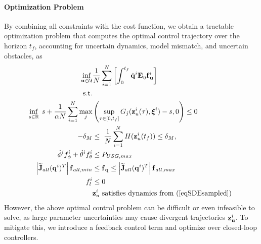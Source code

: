 \documentclass[a4paper,11pt]{article}
\newcommand{\Mat}[1]{\mathbf{\MakeUppercase{#1}}}
\renewcommand{\vec}[1]{\boldsymbol{\mathbf{\MakeLowercase{#1}}}}
\newcommand{\abs}[1]{\left|{#1}\right|}
\begin{document}
\paragraph{Optimization Problem}
By combining all constraints with the cost function, we obtain a tractable optimization problem that computes the optimal control trajectory over the horizon $t_f$, accounting for uncertain dynamics, model mismatch, and uncertain obstacles, as
\begin{subequations}
	\label{eqOCPsaa}
	\begin{align}
	\inf_{\vec{u} \in \mathcal{U}}& \frac 1 N \sum_{i=1}^{N} \left[ \int_0^{t_f} \dot{\vec{q}}^i \Mat{E}_\eta \vec{f}_{\vec{u}}^i \right]
	\\
	\text{s.t.} \notag
	\\
	\inf_{s \in \mathbb{R}} \;  s + \frac{1}{\alpha N} \sum_{i=1}^{N} \max_j &\left( \sup_{\tau \in [0, t_f]} {G}_j({\vec{z}}^i_u(\tau), \vec{\xi}^i) - s, 0 \right) \leq 0 
	\\
	- \delta_M &\leq \; \frac{1}{N} \sum_{i=1}^{N} {H}({\vec{z}}^i_u(t_f)) \leq \delta_M,
	\\
	\dot{\phi}^i f_{\phi}^i + \dot{\theta}^i f_{\theta}^i &\le P_{USG, max}
	\\
	\abs{\widetilde{\Mat{J}}_{all}(\vec{q}^i)^T} \vec{f}_{all, min} &\le \vec{f}_{\vec{q}} \le  \abs{\widetilde{\Mat{J}}_{all}(\vec{q}^i)^T} \vec{f}_{all, max}
	\\
	f_l^i &\le 0
	\\
	& {\vec{z}}_u^i \text{ satisfies dynamics from (\ref{eqSDEsampled}) }
	\end{align}
\end{subequations}
However, the above optimal control problem can be difficult or even infeasible to solve, as large parameter uncertainties may cause divergent trajectories $\vec{z}_{\vec{u}}^i$. To mitigate this, we introduce a feedback control term and optimize over closed-loop controllers.
\end{document}
